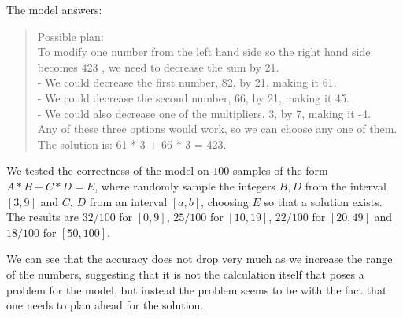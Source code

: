 The model answers:

\begin{quote}
Possible plan: \\
To modify one number from the left hand side so the right hand side becomes 423
, we need to decrease the sum by 21. \\
- We could decrease the first number, 82, by 21, making it 61. \\
- We could decrease the second number, 66, by 21, making it 45. \\
- We could also decrease one of the multipliers, 3, by 7, making it -4. \\

Any of these three options would work, so we can choose any one of them. \\

The solution is: 61 * 3 + 66 * 3 = 423. \\
\end{quote}
\fi
We tested the correctness of the model on $100$ samples of the form $A * B + C * D = E$, where randomly sample the integers $B, D$ from the interval $[3,9]$ and $C$, $D$ from an interval $[a,b]$, choosing $E$ so that a solution exists. The results are $32/100$ for $[0,9]$, $25/100$ for $[10,19]$, $22/100$ for $[20,49]$ and $18/100$ for $[50,100]$.

We can see that the accuracy does not drop very much as we increase the range of the numbers, suggesting that it is not the calculation itself that poses a problem for the model, but instead the problem seems to be with the fact that one needs to plan ahead for the solution.


%
%
%
%
%
%
%
%

